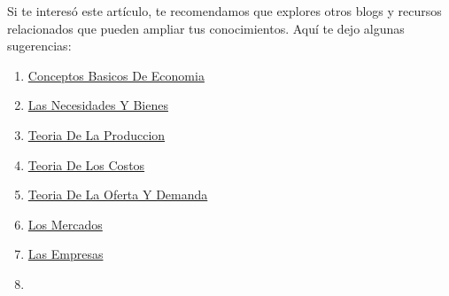 \documentclass[
  jou,
  floatsintext,
  longtable,
  a4paper,
  nolmodern,
  notxfonts,
  notimes,
  colorlinks=true,linkcolor=blue,citecolor=blue,urlcolor=blue]{apa7}
\providecommand{\tightlist}{%
  \setlength{\itemsep}{0pt}\setlength{\parskip}{0pt}}
\begin{document}
Si te interesó este artículo, te recomendamos que explores otros blogs y
recursos relacionados que pueden ampliar tus conocimientos. Aquí te dejo
algunas sugerencias:

\begin{enumerate}
\def\labelenumi{\arabic{enumi}.}
\tightlist
\item
  \href{https://achalmaedison.netlify.app/teching/economia-preuniversitaria/2014-01-01-conceptos-basicos-de-economia/index.pdf}{}
  \href{https://achalmaedison.netlify.app/teching/economia-preuniversitaria/2014-01-01-conceptos-basicos-de-economia}{Conceptos
  Basicos De Economia}
\item
  \href{https://achalmaedison.netlify.app/teching/economia-preuniversitaria/2014-01-07-las-necesidades-y-bienes/index.pdf}{}
  \href{https://achalmaedison.netlify.app/teching/economia-preuniversitaria/2014-01-07-las-necesidades-y-bienes}{Las
  Necesidades Y Bienes}
\item
  \href{https://achalmaedison.netlify.app/teching/economia-preuniversitaria/2014-01-14-teoria-de-la-produccion/index.pdf}{}
  \href{https://achalmaedison.netlify.app/teching/economia-preuniversitaria/2014-01-14-teoria-de-la-produccion}{Teoria
  De La Produccion}
\item
  \href{https://achalmaedison.netlify.app/teching/economia-preuniversitaria/2014-01-21-teoria-de-los-costos/index.pdf}{}
  \href{https://achalmaedison.netlify.app/teching/economia-preuniversitaria/2014-01-21-teoria-de-los-costos}{Teoria
  De Los Costos}
\item
  \href{https://achalmaedison.netlify.app/teching/economia-preuniversitaria/2014-01-28-teoria-de-la-oferta-y-demanda/index.pdf}{}
  \href{https://achalmaedison.netlify.app/teching/economia-preuniversitaria/2014-01-28-teoria-de-la-oferta-y-demanda}{Teoria
  De La Oferta Y Demanda}
\item
  \href{https://achalmaedison.netlify.app/teching/economia-preuniversitaria/2014-02-04-los-mercados/index.pdf}{}
  \href{https://achalmaedison.netlify.app/teching/economia-preuniversitaria/2014-02-04-los-mercados}{Los
  Mercados}
\item
  \href{https://achalmaedison.netlify.app/teching/economia-preuniversitaria/2014-02-11-las-empresas/index.pdf}{}
  \href{https://achalmaedison.netlify.app/teching/economia-preuniversitaria/2014-02-11-las-empresas}{Las
  Empresas}
\item

\end{enumerate}
\end{document}
